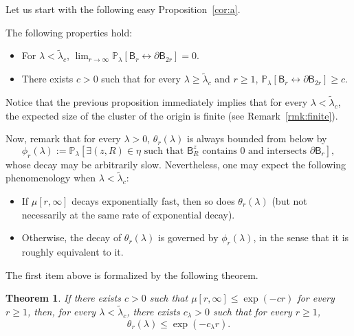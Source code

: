 \documentclass[10pt]{amsart}
\newtheorem{theo}{Theorem}[section]
\theoremstyle{definition}\newtheorem{defi}[theo]{Definition}\newtheorem{rema}[theo]{Remark}\newtheorem{exam}[theo]{Example}\newtheorem{exem}[theo]{Example}\newtheorem{nota}[theo]{Notation}
\begin{document}
Let us start with the following easy Proposition~\ref{cor:a}.


\pagebreak
\begin{prop}\label{cor:a}
The following properties hold:
\begin{itemize}%
\item For $\lambda<\widetilde\lambda_c$, $\displaystyle\lim_{r\rightarrow\infty}{\mathbb P}_\lambda[\mathsf B_r\longleftrightarrow\partial\mathsf B_{2r}]=0$.
\item There exists $c>0$ such that for every $\lambda\ge\widetilde\lambda_c$ and $r\ge1$, ${\mathbb P}_\lambda[\mathsf B_r\longleftrightarrow\partial\mathsf B_{2r}]\ge c$.
\end{itemize}
\end{prop}

Notice that the previous proposition immediately implies that for every $\lambda<\widetilde\lambda_c$, the expected size of the cluster of the origin is finite (see Remark~\ref{rmk:finite}).

Now, remark that for every $\lambda>0$, $\theta_r(\lambda)$ is always bounded from below by
\begin{equation}\label{eq:2}
\phi_r(\lambda):=\mathbb P_\lambda[\exists (z,R)\in\eta\text{ such that } \mathsf B_R^z \text{ contains $0$ and intersects } \partial \mathsf B_r],
\end{equation}
whose decay may be arbitrarily slow. Nevertheless, one may expect the following phenomenology when $\lambda<\widetilde\lambda_c$:
\begin{itemize}%
\item If $\mu[r,\infty]$ decays exponentially fast, then so does $\theta_r(\lambda)$ (but not necessarily at the same rate of exponential decay).
\item Otherwise, the decay of $\theta_r(\lambda)$ is governed by $\phi_r(\lambda)$, in the sense that it is roughly equivalent to it.
\end{itemize}
The first item above is formalized by the following theorem.
\begin{theo}\label{thm:2}
If there exists $c>0$ such that $\mu[r,\infty]\le \exp(-cr)$ for every $r\ge1$, then, for every $\lambda<\widetilde\lambda_c$, there exists $c_\lambda>0$ such that for every $r\ge1$,
\[
\theta_r(\lambda)\le \exp(-c_\lambda r).
\]
\end{theo}
\end{document}

